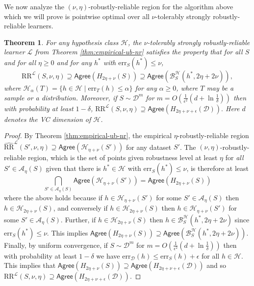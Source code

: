 \documentclass[11pt]{article}
\newcommand{\CR}{\text{RR}}
\newcommand{\ECR}{\widehat{\text{RR}}}
\newcommand{\err}{\mathrm{err}}
\newtheorem{theorem}{Theorem}[section]
\newcommand{\0}{\mathbf{0}}
\newcommand{\1}{\mathbf{1}}
\newcommand{\cA}{\mathcal{A}}
\newcommand{\cB}{\mathcal{B}}
\newcommand{\cD}{\mathcal{D}}
\newcommand{\cH}{\mathcal{H}}
\newcommand{\cL}{\mathcal{L}}
\newcommand{\Agree}{\mathsf{Agree}}
\begin{document}
We now analyze the $(\nu,\eta)$-robustly-reliable region for the algorithm above which we will prove is pointwise optimal over all $\nu$-tolerably strongly robustly-reliable learners.

\begin{theorem}\label{thm:theta-ub-nr}
For any hypothesis class $\cH$, the $\nu$-tolerably strongly robustly-reliable learner $\cL$ from Theorem \ref{thm:empirical-ub-nr} satisfies the property that for all $S$ and for all $\eta\geq 0$ and for any $h^*$ with $\err_S(h^*)\le\nu$,
$$\CR^\cL(S,\nu,\eta)\supseteq \Agree\left(H_{2\eta+\nu}(S)\right)\supseteq \Agree\left(\cB_S^\cH(h^*,2\eta+2\nu)\right),$$
where $\cH_{\alpha}(T)=\{h \in \cH\mid \err_{T}(h)\le \alpha\}$ for any $\alpha\ge 0$, where $T$ may be a sample or a distribution. {Moreover, if  $S\sim \cD^m$ for $m=O(\frac{1}{\epsilon^2}(d+\ln\frac{1}{\delta}))$ then with probability at least $1-\delta$, $\CR^\cL(S,\nu,\eta) \supseteq \Agree(H_{2\eta+\nu+\epsilon}(\cD)).$
Here $d$ denotes the VC dimension of $\cH$.}

\end{theorem}

\begin{proof} By Theorem \ref{thm:empirical-ub-nr}, the empirical $\eta$-robustly-reliable region $\ECR^{\cL}(S',\nu,\eta) \supseteq \Agree(\cH_{\eta+\nu}(S'))$ for any dataset $S'$.
The $(\nu,\eta)$-robustly-reliable region, which is the set of points given robustness level at least $\eta$ for {\em all} $S' \in \cA_\eta(S)$ given that there is $h^*\in\cH$ with $\err_{S}(h^*)\le\nu$, is therefore at least
$$\bigcap_{S' \in \cA_\eta(S)} \Agree(\cH_{\eta+\nu}(S')) = \Agree\left(H_{2\eta+\nu}(S)\right)$$%
where the above holds because if $h\in \cH_{\eta+\nu}(S')$ for some $S' \in \cA_\eta(S)$ then $h\in\cH_{2\eta+\nu}(S)$, and conversely if $h\in\cH_{2\eta+\nu}(S)$ then $h\in \cH_{\eta+\nu}(S')$ for some $S' \in \cA_\eta(S)$. Further, if $h\in\cH_{2\eta+\nu}(S)$ then
$h\in \cB_S^\cH(h^*,2\eta+2\nu)$ since $\err_S(h^*)\le\nu$. This implies $\Agree\left(H_{2\eta+\nu}(S)\right)\supseteq \Agree\left(\cB_S^\cH(h^*,2\eta+2\nu)\right)$. Finally, by uniform convergence, if $S\sim \cD^m$ for $m=O(\frac{1}{\epsilon^2}(d+\ln\frac{1}{\delta}))$ then with probability at least $1-\delta$ we have $\err_\cD(h)\le \err_S(h)+\epsilon$ for all $h \in \cH$.  This implies that
$\Agree(H_{2\eta+\nu}(S)) \supseteq \Agree(H_{2\eta+\nu+\epsilon}(\cD))$
and so $\CR^\cL(S,\nu,\eta) \supseteq \Agree(H_{2\eta+\nu+\epsilon}(\cD))$.
\end{proof}
\end{document}
